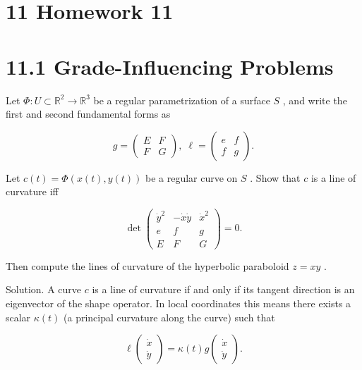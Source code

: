 \documentclass[10pt]{article}
\begin{document}
\section*{11 Homework 11}

\section*{11.1 Grade-Influencing Problems}

\begin{problem}[title=PROBLEM 1 (6 POINTS)]
Let \(\Phi  : U \subset  {\mathbb{R}}^{2} \rightarrow  {\mathbb{R}}^{3}\) be a regular parametrization of a surface \(S\) , and write the first and second fundamental forms as

\[
g = \left( \begin{array}{ll} E & F \\  F & G \end{array}\right) ,\;\ell  = \left( \begin{array}{ll} e & f \\  f & g \end{array}\right) .
\]

Let \(c\left( t\right)  = \Phi \left( {x\left( t\right) ,y\left( t\right) }\right)\) be a regular curve on \(S\) . Show that \(c\) is a line of curvature iff

\[
\det \left( \begin{matrix} {\dot{y}}^{2} &  - \dot{x}\dot{y} & {\dot{x}}^{2} \\  e & f & g \\  E & F & G \end{matrix}\right)  = 0.
\]

Then compute the lines of curvature of the hyperbolic paraboloid \(z = {xy}\) .
\end{problem}

Solution. A curve \(c\) is a line of curvature if and only if its tangent direction is an eigenvector of the shape operator. In local coordinates this means there exists a scalar \(\kappa \left( t\right)\) (a principal curvature along the curve) such that

\[
\ell \left( \begin{matrix} \dot{x} \\  \dot{y} \end{matrix}\right)  = \kappa \left( t\right) g\left( \begin{matrix} \dot{x} \\  \dot{y} \end{matrix}\right) .
\]
\end{document}
